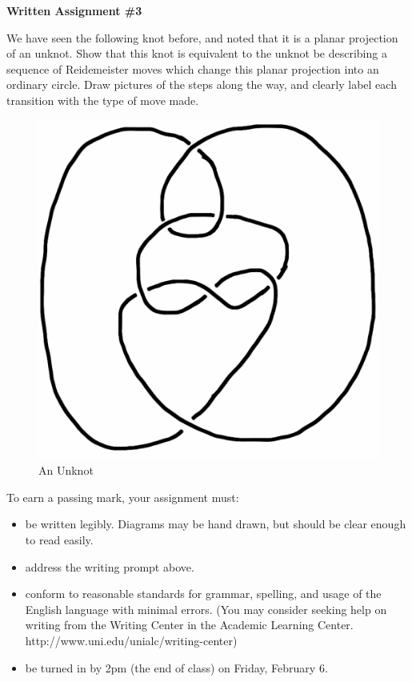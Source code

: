 \documentclass[12pt,letterpaper]{article}
\begin{document}
\setlength{\parskip}{1ex plus 0.5ex minus 0.2ex}
\setlength{\parindent}{0pt}

\pagestyle{fancy}
\lfoot{}
\rfoot{}

\begin{center}
{
\Large
\textbf{Written Assignment \#3}
}
\end{center}

We have seen the following knot before, and noted that it is a planar projection of an unknot.
Show that this knot is equivalent to the unknot be describing a sequence of Reidemeister moves which change this planar projection into an ordinary circle.
Draw pictures of the steps along the way, and clearly label each transition with the type of move made.

\vspace{1cm}



\begin{figure}[h]
    \centering
    \includegraphics[width=.7\textwidth]{knotpics/9SeptQ5b.png}
    \caption{An Unknot}
\end{figure}

To earn a passing mark, your assignment must:
\begin{itemize}
\item be written legibly. Diagrams may be hand drawn, but should be clear enough to read easily.
\item address the writing prompt above.
\item conform to reasonable standards for grammar, spelling, and usage of the English language with minimal errors. (You may consider seeking help on writing from the Writing Center in the Academic Learning Center. http://www.uni.edu/unialc/writing-center)
\item be turned in by 2pm (the end of class) on Friday, February 6.
\end{itemize}
\end{document}
